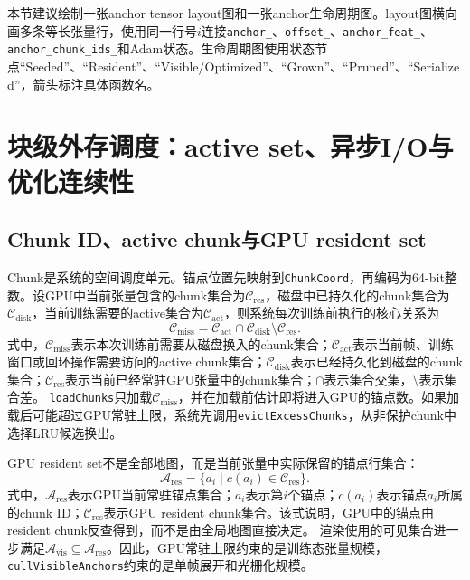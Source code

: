 本节建议绘制一张anchor tensor layout图和一张anchor生命周期图。layout图横向画多条等长张量行，使用同一行号$i$连接\texttt{anchor\_}、\texttt{offset\_}、\texttt{anchor\_feat\_}、\texttt{anchor\_chunk\_ids\_}和Adam状态。生命周期图使用状态节点``Seeded''、``Resident''、``Visible/Optimized''、``Grown''、``Pruned''、``Serialized''，箭头标注具体函数名。

\section{块级外存调度：active set、异步I/O与优化连续性}

\subsection{Chunk ID、active chunk与GPU resident set}

Chunk是系统的空间调度单元。锚点位置先映射到\texttt{ChunkCoord}，再编码为64-bit整数。设GPU中当前张量包含的chunk集合为$\mathcal{C}_{\mathrm{res}}$，磁盘中已持久化的chunk集合为$\mathcal{C}_{\mathrm{disk}}$，当前训练需要的active集合为$\mathcal{C}_{\mathrm{act}}$，则系统每次训练前执行的核心关系为
\begin{equation}
\mathcal{C}_{\mathrm{miss}}
=
\mathcal{C}_{\mathrm{act}}
\cap
\mathcal{C}_{\mathrm{disk}}
\setminus
\mathcal{C}_{\mathrm{res}}.
\end{equation}
式中，$\mathcal{C}_{\mathrm{miss}}$表示本次训练前需要从磁盘换入的chunk集合；$\mathcal{C}_{\mathrm{act}}$表示当前帧、训练窗口或回环操作需要访问的active chunk集合；$\mathcal{C}_{\mathrm{disk}}$表示已经持久化到磁盘的chunk集合；$\mathcal{C}_{\mathrm{res}}$表示当前已经常驻GPU张量中的chunk集合；$\cap$表示集合交集，$\setminus$表示集合差。
\texttt{loadChunks}只加载$\mathcal{C}_{\mathrm{miss}}$，并在加载前估计即将进入GPU的锚点数。如果加载后可能超过GPU常驻上限，系统先调用\texttt{evictExcessChunks}，从非保护chunk中选择LRU候选换出。

GPU resident set不是全部地图，而是当前张量中实际保留的锚点行集合：
\begin{equation}
\mathcal{A}_{\mathrm{res}}
=
\{a_i \mid c(a_i)\in\mathcal{C}_{\mathrm{res}}\}.
\end{equation}
式中，$\mathcal{A}_{\mathrm{res}}$表示GPU当前常驻锚点集合；$a_i$表示第$i$个锚点；$c(a_i)$表示锚点$a_i$所属的chunk ID；$\mathcal{C}_{\mathrm{res}}$表示GPU resident chunk集合。该式说明，GPU中的锚点由resident chunk反查得到，而不是由全局地图直接决定。
渲染使用的可见集合进一步满足$\mathcal{A}_{\mathrm{vis}}\subseteq\mathcal{A}_{\mathrm{res}}$。因此，GPU常驻上限约束的是训练态张量规模，\texttt{cullVisibleAnchors}约束的是单帧展开和光栅化规模。

